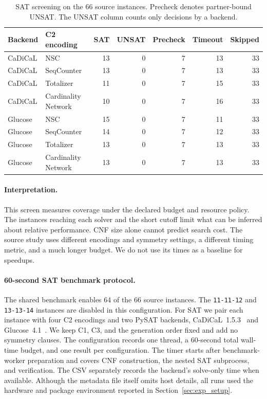 \documentclass[a4paper,fleqn]{cas-sc}
\begin{document}
\begin{table}[pos=!htb]
\centering\small
\caption{SAT screening on the 66 source instances. Precheck denotes partner-bound UNSAT. The UNSAT column counts only decisions by a backend.}
\label{tab:exp1_c2}
\begin{tabular}{llrrrrr}
\toprule
Backend & C2 encoding & SAT & UNSAT & Precheck & Timeout & Skipped \\
\midrule
CaDiCaL & NSC & 13 & 0 & 7 & 13 & 33 \\
CaDiCaL & SeqCounter & 13 & 0 & 7 & 13 & 33 \\
CaDiCaL & Totalizer & 11 & 0 & 7 & 15 & 33 \\
CaDiCaL & Cardinality Network & 10 & 0 & 7 & 16 & 33 \\
\midrule
Glucose & NSC & 15 & 0 & 7 & 11 & 33 \\
Glucose & SeqCounter & 14 & 0 & 7 & 12 & 33 \\
Glucose & Totalizer & 13 & 0 & 7 & 13 & 33 \\
Glucose & Cardinality Network & 13 & 0 & 7 & 13 & 33 \\
\bottomrule
\end{tabular}
\end{table}

\paragraph{Interpretation.}
This screen measures coverage under the declared budget and resource
policy. The instances reaching each solver and the short cutoff limit
what can be inferred about relative performance. CNF size alone cannot
predict search cost. The source study uses different encodings and
symmetry settings, a different timing metric, and a much longer budget.
We do not use its times as a baseline for speedups.

\paragraph{60-second SAT benchmark protocol.}
The shared benchmark enables 64 of the 66 source instances. The
\texttt{11-11-12} and \texttt{13-13-14} instances are disabled in this
configuration. For SAT we pair each instance with four C2 encodings
and two PySAT backends, CaDiCaL~1.5.3~\cite{cadical153} and
Glucose~4.1~\cite{audemard2018glucose}. We keep C1, C3, and the
generation order fixed and add no symmetry clauses. The configuration
records one thread, a 60-second total wall-time budget, and one result per
configuration. The timer starts after benchmark-worker preparation and
covers CNF construction, the nested SAT subprocess, and verification.
The CSV separately records the backend's solve-only time when available.
Although the metadata file itself omits host details, all runs used the hardware and package environment reported in Section~\ref{sec:exp_setup}.
\end{document}
